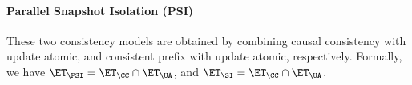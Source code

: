 
\paragraph{Parallel Snapshot Isolation (PSI)} 
These two consistency models are obtained by combining causal consistency with update atomic, 
and consistent prefix with update atomic, respectively. Formally, we have 
$\ET_{\PSI} = \ET_{\CC} \cap \ET_{\UA}$, and $\ET_{\SI} = \ET_{\CC} \cap \ET_{\UA}$.

